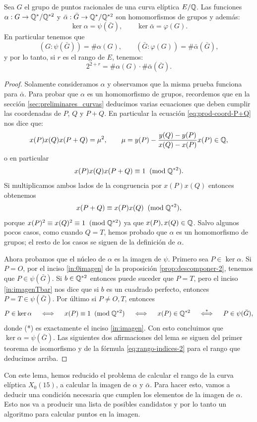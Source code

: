 \documentclass[../../tesis_maestria]{subfiles}
\begin{document}
\begin{lema}
	Sea $G$ el grupo de puntos racionales de una curva elíptica $E/\mathbb{Q}$. Las funciones $\alpha:G\rightarrow\mathbb{Q}^*/\mathbb{Q}^{*2}$ y $\bar{\alpha}:\bar{G}\rightarrow\mathbb{Q}^*/\mathbb{Q}^{*2}$ son homomorfismos de grupos y además:
	\[
		\ker\alpha=\psi(\bar{G}),\qquad \ker\bar{\alpha}=\varphi(G).
	\]
	En particular tenemos que
	\[
		(G:\psi(\bar{G}))=\#\alpha(G),\qquad (\bar{G}:\varphi(G))=\#\bar{\alpha}(\bar{G}),
	\]
	y por lo tanto, si $r$ es el rango de $E$, tenemos:
	\[
		2^{2+r}=\#\alpha(G)\cdot \#\bar{\alpha}(\bar{G}).
	\]
\end{lema}

\begin{proof}
Solamente consideramos $\alpha$ y observamos que la misma prueba funciona para $\bar{\alpha}$. Para probar que $\alpha$ es un homomorfismo de grupos, recordemos que en la sección \ref{sec:preliminares_curvas} deducimos varias ecuaciones que deben cumplir las coordenadas de $P$, $Q$ y $P+Q$. En particular la ecuación \ref{eq:prod-coord-P+Q} nos dice que:
\[
	x(P)x(Q)x(P+Q)=\mu^2,\qquad \mu=y(P)-\frac{y(Q)-y(P)}{x(Q)-x(P)}x(P)\in\mathbb{Q},
\]
o en particular
\[
	x(P)x(Q)x(P+Q)\equiv 1\;\;(\mathrm{mod}\; \mathbb{Q}^{*2}).
\]
Si multiplicamos ambos lados de la congruencia por $x(P)x(Q)$ entonces obtenemos
\[
	x(P+Q)\equiv x(P)x(Q)\;\;(\mathrm{mod}\; \mathbb{Q}^{*2}),
\]
porque $x(P)^2\equiv x(Q)^2\equiv1\;\;(\mathrm{mod}\; \mathbb{Q}^{*2})$ ya que $x(P),x(Q)\in\mathbb{Q}$. Salvo algunos pocos casos, como cuando $Q=T$, hemos probado que $\alpha$ es un homomorfismo de grupos; el resto de los casos se siguen de la definición de $\alpha$. 

Ahora probamos que el núcleo de $\alpha$ es la imagen de $\psi$. Primero sea $P\in\ker\alpha$. Si $P=O$, por el inciso \ref{in:0imagen} de la proposición \ref{prop:descomponer-2}, tenemos que $P\in\psi(\bar{G})$. Si $b\in\mathbb{Q}^{*2}$ entonces puede suceder que $P=T$, pero el inciso \ref{in:imagenTbar} nos dice que si $b$ es un cuadrado perfecto, entonces $P=T\in\psi(\bar{G})$. Por último si $P\neq O,T$, entonces
\[
	P\in\ker\alpha\quad\iff\quad x(P)\equiv 1\;\;(\mathrm{mod}\; \mathbb{Q}^{*2}) \quad\iff\quad x(P)\in\mathbb{Q}^{*2} \quad\overset{*}{\iff}\quad P\in\psi(\bar{G}),
\]
donde (*) es exactamente el inciso \ref{in:imagen}. Con esto concluimos que $\ker\alpha=\psi(\bar{G})$. Las siguientes dos afirmaciones del lema se siguen del primer teorema de isomorfismo y de la fórmula \eqref{eq:rango-indices-2} para el rango que deducimos arriba. 
\end{proof}

Con este lema, hemos reducido el problema de calcular el rango de la curva elíptica $X_0(15)$, a calcular la imagen de $\alpha$ y $\bar{\alpha}$. Para hacer esto, vamos a deducir una condición necesaria que cumplen los elementos de la imagen de $\alpha$. Esto nos va a producir una lista de posibles candidatos y por lo tanto un algoritmo para calcular puntos en la imagen.
\end{document}
